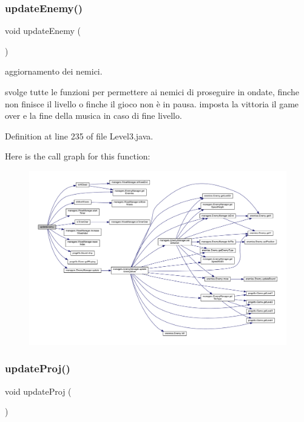 \subsubsection{\texorpdfstring{update\+Enemy()}{updateEnemy()}}
{\footnotesize\ttfamily void update\+Enemy (\begin{DoxyParamCaption}{ }\end{DoxyParamCaption})}



aggiornamento dei nemici. 

svolge tutte le funzioni per permettere ai nemici di proseguire in ondate, finche non finisce il livello o finche il gioco non è in pausa. imposta la vittoria il game over e la fine della musica in caso di fine livello. 

Definition at line 235 of file Level3.\+java.

Here is the call graph for this function\+:
\nopagebreak
\begin{figure}[H]
\begin{center}
\leavevmode
\includegraphics[width=350pt]{classscenes_1_1_level3_af005ec68c869a6acd5e833cba9330a50_cgraph}
\end{center}
\end{figure}
\mbox{\label{classscenes_1_1_level3_ac83c203b559f6fd0bb225744d7ccf854}} 
\subsubsection{\texorpdfstring{update\+Proj()}{updateProj()}}
{\footnotesize\ttfamily void update\+Proj (\begin{DoxyParamCaption}{ }\end{DoxyParamCaption})}



